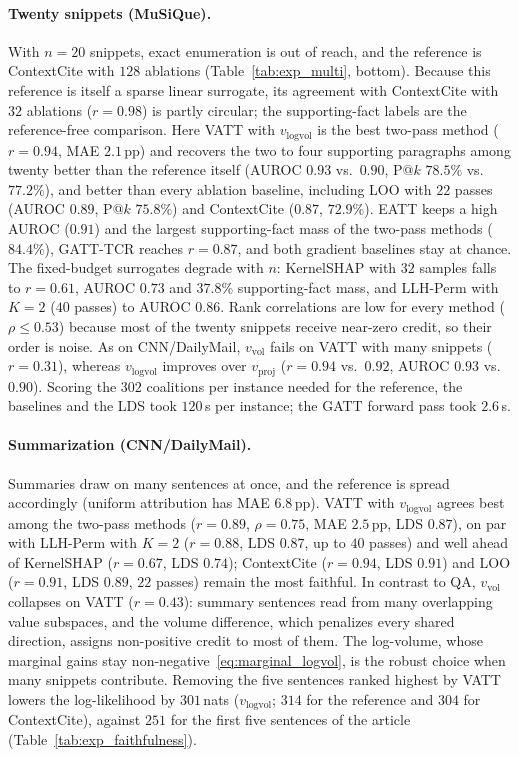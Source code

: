 \paragraph{Twenty snippets (MuSiQue).}
With $n = 20$ snippets, exact enumeration is out of reach, and the reference is ContextCite with $128$ ablations (Table~\ref{tab:exp_multi}, bottom). Because this reference is itself a sparse linear surrogate, its agreement with ContextCite with $32$ ablations ($r = 0.98$) is partly circular; the supporting-fact labels are the reference-free comparison. Here VATT with $v_{\text{logvol}}$ is the best two-pass method ($r = 0.94$, MAE $2.1$\,pp) and recovers the two to four supporting paragraphs among twenty better than the reference itself (AUROC $0.93$ vs.\ $0.90$, P@$k$ $78.5\%$ vs.\ $77.2\%$), and better than every ablation baseline, including LOO with $22$ passes (AUROC $0.89$, P@$k$ $75.8\%$) and ContextCite ($0.87$, $72.9\%$). EATT keeps a high AUROC ($0.91$) and the largest supporting-fact mass of the two-pass methods ($84.4\%$), GATT-TCR reaches $r = 0.87$, and both gradient baselines stay at chance. The fixed-budget surrogates degrade with $n$: KernelSHAP with $32$ samples falls to $r = 0.61$, AUROC $0.73$ and $37.8\%$ supporting-fact mass, and LLH-Perm with $K = 2$ ($40$ passes) to AUROC $0.86$. Rank correlations are low for every method ($\rho \le 0.53$) because most of the twenty snippets receive near-zero credit, so their order is noise. As on CNN/DailyMail, $v_{\text{vol}}$ fails on VATT with many snippets ($r = 0.31$), whereas $v_{\text{logvol}}$ improves over $v_{\text{proj}}$ ($r = 0.94$ vs.\ $0.92$, AUROC $0.93$ vs.\ $0.90$). Scoring the $302$ coalitions per instance needed for the reference, the baselines and the LDS took $120$\,s per instance; the GATT forward pass took $2.6$\,s.

\paragraph{Summarization (CNN/DailyMail).}
Summaries draw on many sentences at once, and the reference is spread accordingly (uniform attribution has MAE $6.8$\,pp). VATT with $v_{\text{logvol}}$ agrees best among the two-pass methods ($r = 0.89$, $\rho = 0.75$, MAE $2.5$\,pp, LDS $0.87$), on par with LLH-Perm with $K = 2$ ($r = 0.88$, LDS $0.87$, up to $40$ passes) and well ahead of KernelSHAP ($r = 0.67$, LDS $0.74$); ContextCite ($r = 0.94$, LDS $0.91$) and LOO ($r = 0.91$, LDS $0.89$, $22$ passes) remain the most faithful. In contrast to QA, $v_{\text{vol}}$ collapses on VATT ($r = 0.43$): summary sentences read from many overlapping value subspaces, and the volume difference, which penalizes every shared direction, assigns non-positive credit to most of them. The log-volume, whose marginal gains stay non-negative~\eqref{eq:marginal_logvol}, is the robust choice when many snippets contribute. Removing the five sentences ranked highest by VATT lowers the log-likelihood by $301$\,nats ($v_{\text{logvol}}$; $314$ for the reference and $304$ for ContextCite), against $251$ for the first five sentences of the article (Table~\ref{tab:exp_faithfulness}).

